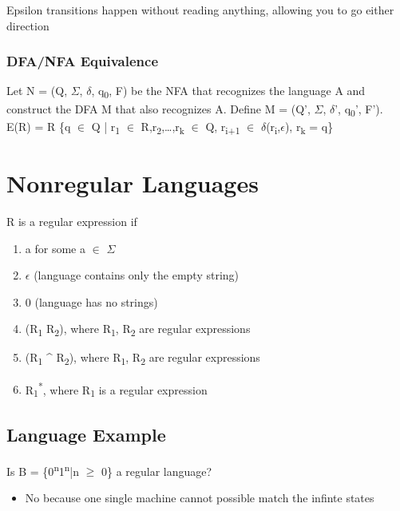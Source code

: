 \documentclass[11pt]{article}
\begin{document}
Epsilon transitions happen without reading anything, allowing you to go either direction\\
\subsubsection{DFA/NFA Equivalence}
\label{sec:orgae015f3}
Let N = (Q, \(\Sigma\), \(\delta\), q\textsubscript{0}, F) be the NFA that recognizes the language A and construct the DFA M that also recognizes A. Define M = (Q', \(\Sigma\), \(\delta\)', q\textsubscript{0}', F').\\


E(R) = R \Union \{q \(\in\) Q | \quantifier{}r\textsubscript{1} \(\in\) R,r\textsubscript{2},\ldots{},r\textsubscript{k} \(\in\) Q, r\textsubscript{i+1} \(\in\) \(\delta\)(r\textsubscript{i},\(\epsilon\)), r\textsubscript{k} = q\}\\
\section{Nonregular Languages}
\label{sec:org005b7bd}
R is a regular expression if\\
\begin{enumerate}
\item a for some a \(\in\) \(\Sigma\)\\
\item \(\epsilon\) (language contains only the empty string)\\
\item 0 (language has no strings)\\
\item (R\textsubscript{1} \union R\textsubscript{2}), where R\textsubscript{1}, R\textsubscript{2} are regular expressions\\
\item (R\textsubscript{1} \^{} R\textsubscript{2}), where R\textsubscript{1}, R\textsubscript{2} are regular expressions\\
\item R\textsubscript{1}\textsuperscript{*}, where R\textsubscript{1} is a regular expression\\
\end{enumerate}
\subsection{Language Example}
\label{sec:orgbbf7ebb}
Is B = \{0\textsuperscript{n}1\textsuperscript{n}|n \(\ge\) 0\} a regular language?\\
\begin{itemize}
\item No because one single machine cannot possible match the infinte states\\
\end{itemize}
\end{document}
